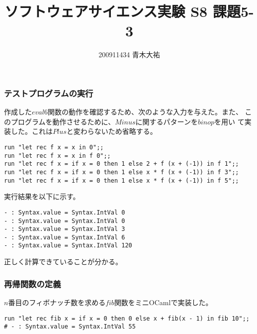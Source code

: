 \documentclass[a4paper,9pt]{jarticle}
\title{ソフトウェアサイエンス実験 S8 課題5-3}
\author{200911434 青木大祐}
\begin{document}
\maketitle
\setcounter{section}{5}
\setcounter{subsection}{3}

\newpage
\subsubsection{テストプログラムの実行}
作成した$eval6$関数の動作を確認するため、次のような入力を与えた。また、
このプログラムを動作させるために、$Minus$に関するパターンを$binop$を用い
て実装した。これは$Plus$と変わらないため省略する。

\begin{lstlisting}
run "let rec f x = x in 0";;
run "let rec f x = x in f 0";;
run "let rec f x = if x = 0 then 1 else 2 + f (x + (-1)) in f 1";;
run "let rec f x = if x = 0 then 1 else x * f (x + (-1)) in f 3";;
run "let rec f x = if x = 0 then 1 else x * f (x + (-1)) in f 5";;
\end{lstlisting}

実行結果を以下に示す。

\begin{lstlisting}
- : Syntax.value = Syntax.IntVal 0
- : Syntax.value = Syntax.IntVal 0
- : Syntax.value = Syntax.IntVal 3
- : Syntax.value = Syntax.IntVal 6
- : Syntax.value = Syntax.IntVal 120
\end{lstlisting}
正しく計算できていることが分かる。

\subsubsection{再帰関数の定義}
$n$番目のフィボナッチ数を求める$fib$関数をミニOCamlで実装した。

\begin{lstlisting}
run "let rec fib x = if x = 0 then 0 else x + fib(x - 1) in fib 10";;
# - : Syntax.value = Syntax.IntVal 55
\end{lstlisting}
\end{document}
